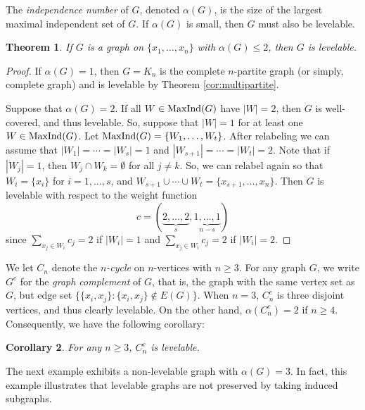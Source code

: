 \documentclass[12pt]{amsart}
\numberwithin{equation}{section}
\newtheorem{theorem}{Theorem}[section]
\newtheorem{corollary}[theorem]{Corollary}
\theoremstyle{definition}
\newcounter{i} %
\begin{document}
The {\it independence number} of $G$, denoted $\alpha(G)$, is
the size of the largest maximal independent set of $G$.   If
$\alpha(G)$ is small, then $G$ must also be levelable.

\begin{theorem}\label{thm.smallalapha}
    If $G$ is a graph on $\{x_1,\dots,x_n\}$ with $\alpha(G) \leq 2$, then 
    $G$ is levelable.
\end{theorem}

\begin{proof}
    If $\alpha(G) =1$, then $G = K_n$ is the 
    complete $n$-partite graph (or simply, complete
    graph) and is levelable by Theorem \ref{cor:multipartite}.

    Suppose that $\alpha(G) =2$.  If all $W \in {\rm MaxInd}(G)$
    have $|W|=2$, then $G$ is well-covered, and thus levelable.
    So, suppose that $|W| =1$ for at least
    one $W \in {\rm MaxInd}(G)$.  Let
    ${\rm MaxInd}(G) = \{W_1,\ldots,W_t\}$. After relabeling we can assume
    that $|W_1| = \cdots = |W_s| =1$ and $|W_{s+1}|=\cdots=
    |W_t|=2$.  Note that if $|W_j|=1$, then $W_j \cap W_k 
    = \emptyset$ for all $j \neq k$.  So, we can relabel
    again so that $W_i = \{x_i\}$ for $i=1,\ldots,s$,
    and $W_{s+1} \cup \cdots \cup W_t = \{x_{s+1},\ldots,x_n\}$.
    Then $G$ is levelable with respect to the weight
    function
    \[c = (\underbrace{2,\ldots,2}_s,\underbrace{1,\ldots,1}_{n-s})\]
    since $\sum_{x_j\in W_i} c_j = 2$ if $|W_i| =1$ and
    $\sum_{x_j \in W_i} c_j = 2$ if $|W_i|=2$. 
\end{proof}

We let $C_n$ denote the {\it $n$-cycle} on $n$-vertices with
$n \geq 3$. For any
graph $G$, we write $G^c$ for the {\it graph complement} of $G$,
that is, the graph with the same vertex set as $G$, but
edge set $\{\{x_i,x_j\} : \{x_i,x_j\} \not\in E(G)\}$.
When $n =3 $, $C_n^c$ is three disjoint vertices,
and thus clearly levelable. On the other hand,
$\alpha(C_n^c) = 2$ if $n \geq 4$.
Consequently, we have the following corollary:

\begin{corollary}\label{cor.complementcycle}
For any $n \geq 3$, $C_n^c$ is levelable.
\end{corollary}

The next example exhibits a 
non-levelable graph
with $\alpha(G) =3$. In fact, this
example illustrates that levelable
graphs are not preserved by taking induced subgraphs.
\end{document}
